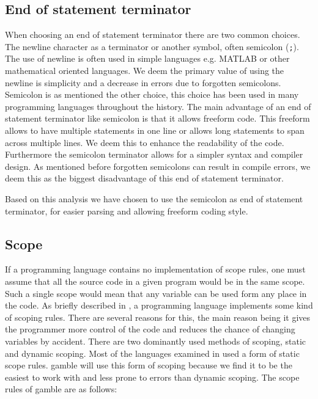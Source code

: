 \subsection*{End of statement terminator}
When choosing an end of statement terminator there are two common choices.
The newline character as a terminator or another symbol, often semicolon (\texttt{;}).
The use of newline is often used in simple languages e.g. MATLAB or other mathematical oriented languages.
We deem the primary value of using the newline is simplicity and a decrease in errors due to forgotten semicolons. 
Semicolon is as mentioned the other choice, this choice has been used in many programming languages throughout the history. 
The main advantage of an end of statement terminator like semicolon is that it allows freeform code. 
This freeform allows to have multiple statements in one line or allows long statements to span across multiple lines.
We deem this to enhance the readability of the code.
Furthermore the semicolon terminator allows for a simpler syntax and compiler design. 
As mentioned before forgotten semicolons can result in compile errors, we deem this as the biggest disadvantage of this end of statement terminator.

Based on this analysis we have chosen to use the semicolon as end of statement terminator, for easier parsing and allowing freeform coding style.

\subsection*{Scope}\label{subsec:Scope}
If a programming language contains no implementation of scope rules, one must assume that all the source code in a given program would be in the same scope. 
Such a single scope would mean that any variable can be used form any place in the code. 
As briefly described in , a programming language implements some kind of scoping rules.
There are several reasons for this, the main reason being it gives the programmer more control of the code and reduces the chance of changing variables by accident.
There are two dominantly used methods of scoping, static and dynamic scoping.
Most of the languages examined in  used a form of static scope rules. 
\gls{gamble} will use this form of scoping because we find it to be the easiest to work with and less prone to errors than dynamic scoping.
The scope rules of \gls{gamble} are as follows:

